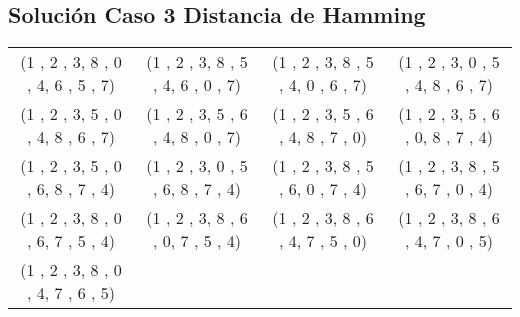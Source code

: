 \documentclass[11pt]{article}
\begin{document}
\subsection{Solución Caso 3 Distancia de Hamming}
\begin{tabular}{c c c c}
(1 , 2 , 3,
8 , 0 , 4,
6 , 5 , 7)
&

(1 , 2 , 3,
8 , 5 , 4,
6 , 0 , 7)
&

(1 , 2 , 3,
8 , 5 , 4,
0 , 6 , 7)
&

(1 , 2 , 3,
0 , 5 , 4,
8 , 6 , 7)
\\


(1 , 2 , 3,
5 , 0 , 4,
8 , 6 , 7)
&

(1 , 2 , 3,
5 , 6 , 4,
8 , 0 , 7)
&

(1 , 2 , 3,
5 , 6 , 4,
8 , 7 , 0)
&


(1 , 2 , 3,
5 , 6 , 0,
8 , 7 , 4)
\\


(1 , 2 , 3,
5 , 0 , 6,
8 , 7 , 4)
&

(1 , 2 , 3,
0 , 5 , 6,
8 , 7 , 4)
&


(1 , 2 , 3,
8 , 5 , 6,
0 , 7 , 4)
&

(1 , 2 , 3,
8 , 5 , 6,
7 , 0 , 4)
\\

(1 , 2 , 3,
8 , 0 , 6,
7 , 5 , 4)

&
(1 , 2 , 3,
8 , 6 , 0,
7 , 5 , 4)
&

(1 , 2 , 3,
8 , 6 , 4,
7 , 5 , 0)
&

(1 , 2 , 3,
8 , 6 , 4,
7 , 0 , 5)
\\

(1 , 2 , 3,
8 , 0 , 4,
7 , 6 , 5)
\end{tabular}
\clearpage
\end{document}
